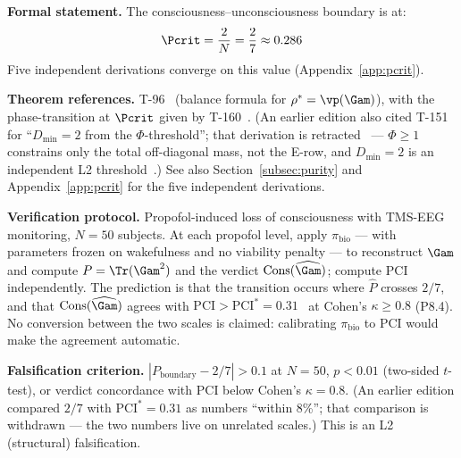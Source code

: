 \begin{predictionbox}
\textbf{Formal statement.}
The consciousness--unconsciousness boundary is at:
\begin{equation}
  \Pcrit = \frac{2}{N} = \frac{2}{7} \approx 0.286
\end{equation}
Five independent derivations converge on this value (Appendix~\ref{app:pcrit}).

\medskip\noindent
\textbf{Theorem references.} T-96~ (balance formula for $\rho^* = \vp(\Gam)$),
with the phase-transition at $\Pcrit$ given by T-160~. (An earlier
edition also cited T-151 for ``$D_{\min} = 2$ from the $\Phi$-threshold''; that
derivation is retracted~\status{$\times$} --- $\Phi \geq 1$ constrains only the
total off-diagonal mass, not the E-row, and $D_{\min} = 2$ is an independent L2
threshold~.)
See also Section~\ref{subsec:purity} and Appendix~\ref{app:pcrit} for the five
independent derivations.

\medskip\noindent
\textbf{Verification protocol.}
Propofol-induced loss of consciousness with TMS-EEG monitoring, $N = 50$ subjects.
At each propofol level, apply $\pi_{\mathrm{bio}}$ --- with parameters frozen on
wakefulness and no viability penalty --- to reconstruct $\Gam$ and compute
$P = \Tr(\Gam^2)$ and the verdict $\mathrm{Cons}(\widehat\Gam)$; compute PCI
independently. The prediction is that the transition occurs where $\widehat P$
crosses $2/7$, and that $\mathrm{Cons}(\widehat\Gam)$ agrees with
$\mathrm{PCI} > \mathrm{PCI}^* = 0.31$~\cite{casali2013} at Cohen's
$\kappa \geq 0.8$ (P8.4). No conversion between the two scales is claimed:
calibrating $\pi_{\mathrm{bio}}$ to PCI would make the agreement automatic.

\medskip\noindent
\textbf{Falsification criterion.}
$|P_{\mathrm{boundary}} - 2/7| > 0.1$ at $N = 50$, $p < 0.01$ (two-sided $t$-test),
or verdict concordance with PCI below Cohen's $\kappa = 0.8$.
(An earlier edition compared $2/7$ with $\mathrm{PCI}^* = 0.31$ as numbers
``within 8\%''; that comparison is withdrawn --- the two numbers live on
unrelated scales.) This is an L2 (structural) falsification.
\end{predictionbox}

